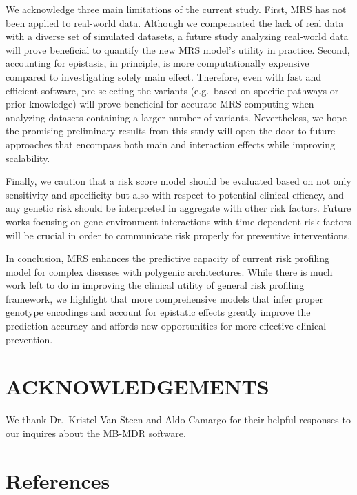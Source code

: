 \documentclass[a4paper,twoside, 9pt]{article}
\begin{document}
We acknowledge three main limitations of the current study. First, MRS has not
been applied to real-world data. Although we compensated the lack of
real data with a diverse set of simulated datasets, a future study
analyzing real-world data will prove beneficial to quantify the new MRS
model's utility in practice. Second, accounting for epistasis, in
principle, is more computationally expensive compared to
investigating solely main effect. Therefore, even with fast and
efficient software, pre-selecting the variants (e.g.~based on specific
pathways or prior knowledge) will prove beneficial for accurate MRS
computing when analyzing datasets containing a larger number of
variants. Nevertheless, we hope the promising preliminary results from
this study will open the door to future approaches that encompass both
main and interaction effects while improving scalability.

Finally, we caution that a risk score model should be evaluated based on
not only sensitivity and specificity but also with respect to potential
clinical efficacy, and any genetic risk should be interpreted in
aggregate with other risk factors. Future works focusing on
gene-environment interactions with time-dependent risk factors will be
crucial in order to communicate risk properly for preventive
interventions.

In conclusion, MRS enhances the predictive capacity of current risk
profiling model for complex diseases with polygenic architectures. While
there is much work left to do in improving the clinical
utility of general risk profiling framework, we highlight that more
comprehensive models that infer proper genotype encodings and account
for epistatic effects greatly improve the prediction accuracy and
affords new opportunities for more effective clinical prevention.

\hypertarget{acknowledgement}{%
\section{\uppercase{Acknowledgements}}\label{acknowledgement}}

We thank Dr.~Kristel Van Steen and Aldo Camargo for their helpful
responses to our inquires about the MB-MDR software.

\hypertarget{references}{%
\section*{References}\label{references}}
\end{document}
